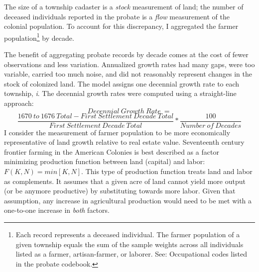 \documentclass[11pt, oneside]{article}
\begin{document}


The size of a township cadaster is a {\em stock} measurement of land; the number of deceased individuals reported in the probate is a {\em flow} measurement of the colonial population. %
To account for this discrepancy, I aggregated the farmer population\footnote{Each record represents a deceased individual. The farmer population of a given township equals the sum of the sample weights across all individuals listed as a farmer, artisan-farmer, or laborer. See: Occupational codes listed in the probate codebook.} by decade.


The benefit of aggregating probate records by decade comes at the cost of fewer observations and less variation. Annualized growth rates had many gaps, were too variable, carried too much noise, and did not reasonably represent changes in the stock of colonized land. The model assigns one decennial growth rate to each township, {\em i}. The decennial growth rates were computed using a straight-line approach:
\[
Decennial \ Growth \ Rate \ =
\]
\[
\frac{ 1670 \ to \ 1676 \ Total - First \ Settlement \ Decade \ Total }{First \ Settlement \ Decade \ Total} *
\frac{100}{Number \ of \ Decades}
\]
I consider the measurement of farmer population to be more economically representative of land growth relative to real estate value. Seventeenth century frontier farming in the American Colonies is best described as a factor minimizing production function between land (capital) and labor: $F(K,N)=min[K,N]$. This type of production function treats land and labor as complements. It assumes that a given acre of land cannot yield more output (or be anymore productive) by substituting towards more labor. Given that assumption, any increase in agricultural production would need to be met with a one-to-one increase in {\em both} factors. 
\end{document}

